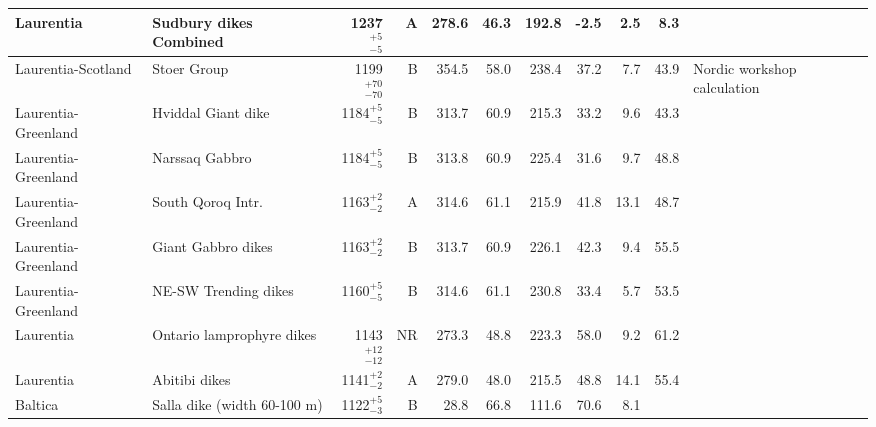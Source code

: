 \documentclass[twocolumn, switch]{article} %
\begin{document}
{\begin{landscape}
\begin{ThreePartTable}
\begin{longtable}{p{1.4 in}p{1.2 in}rrrrrrrrp{1.2 in}}
                     Laurentia &                             Sudbury dikes Combined &     1237$^{+5}_{-5}$ &      A &     278.6 &      46.3 & 192.8 &  -2.5 &       2.5 &         8.3 &                                 \cite{Palmer1977a} \\ \hline
            Laurentia-Scotland &                                        Stoer Group &   1199$^{+70}_{-70}$ &      B &     354.5 &      58.0 & 238.4 &  37.2 &       7.7 &        43.9 &                        Nordic workshop calculation \\ \hline
           Laurentia-Greenland &                                 Hviddal Giant dike &     1184$^{+5}_{-5}$ &      B &     313.7 &      60.9 & 215.3 &  33.2 &       9.6 &        43.3 &                                  \cite{Piper1977a} \\ \hline
           Laurentia-Greenland &                                     Narssaq Gabbro &     1184$^{+5}_{-5}$ &      B &     313.8 &      60.9 & 225.4 &  31.6 &       9.7 &        48.8 &                                  \cite{Piper1977a} \\ \hline
           Laurentia-Greenland &                                  South Qoroq Intr. &     1163$^{+2}_{-2}$ &      A &     314.6 &      61.1 & 215.9 &  41.8 &      13.1 &        48.7 &                                  \cite{Piper1992a} \\ \hline
           Laurentia-Greenland &                                 Giant Gabbro dikes &     1163$^{+2}_{-2}$ &      B &     313.7 &      60.9 & 226.1 &  42.3 &       9.4 &        55.5 &                                  \cite{Piper1977a} \\ \hline
           Laurentia-Greenland &                               NE-SW Trending dikes &     1160$^{+5}_{-5}$ &      B &     314.6 &      61.1 & 230.8 &  33.4 &       5.7 &        53.5 &                                  \cite{Piper1992a} \\ \hline
                     Laurentia &                          Ontario lamprophyre dikes &   1143$^{+12}_{-12}$ &     NR &     273.3 &      48.8 & 223.3 &  58.0 &       9.2 &        61.2 &                                 \cite{Piispa2018a} \\ \hline
                     Laurentia &                                      Abitibi dikes &     1141$^{+2}_{-2}$ &      A &     279.0 &      48.0 & 215.5 &  48.8 &      14.1 &        55.4 &                                  \cite{Ernst1993a} \\ \hline                       Baltica &                        Salla dike (width 60-100 m) &     1122$^{+5}_{-3}$ &      B &      28.8 &      66.8 & 111.6 &  70.6 &       8.1 &          &                                                 \\ \hline

\end{longtable}
\end{ThreePartTable}
\end{landscape}}
\end{document}
